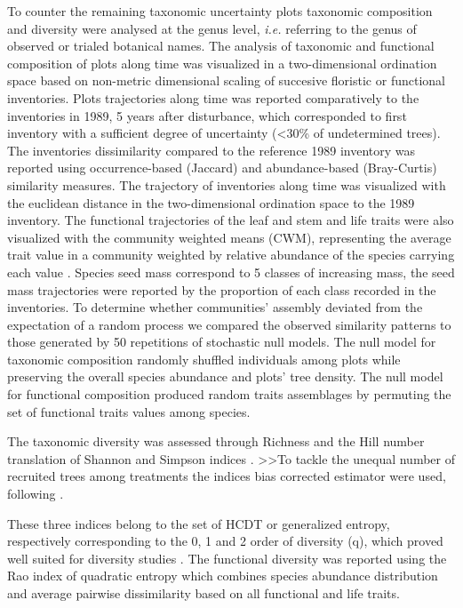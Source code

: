 \documentclass[fleqn,10pt]{ArtEcoFoG} %
\theoremstyle{definition}
\theoremstyle{definition}
\theoremstyle{definition}
\theoremstyle{remark}
\begin{document}
To counter the remaining taxonomic uncertainty plots taxonomic
composition and diversity were analysed at the genus level, \emph{i.e.}
referring to the genus of observed or trialed botanical names. The
analysis of taxonomic and functional composition of plots along time was
visualized in a two-dimensional ordination space based on non-metric
dimensional scaling of succesive floristic or functional inventories.
Plots trajectories along time was reported comparatively to the
inventories in 1989, 5 years after disturbance, which corresponded to
first inventory with a sufficient degree of uncertainty (\textless{}30\%
of undetermined trees). The inventories dissimilarity compared to the
reference 1989 inventory was reported using occurrence-based (Jaccard)
and abundance-based (Bray-Curtis) similarity measures. The trajectory of
inventories along time was visualized with the euclidean distance in the
two-dimensional ordination space to the 1989 inventory. The functional
trajectories of the leaf and stem and life traits were also visualized
with the community weighted means (CWM), representing the average trait
value in a community weighted by relative abundance of the species
carrying each value \citep{Diaz2007, Garnier2004}. Species seed mass
correspond to 5 classes of increasing mass, the seed mass trajectories
were reported by the proportion of each class recorded in the
inventories. To determine whether communities' assembly deviated from
the expectation of a random process we compared the observed similarity
patterns to those generated by 50 repetitions of stochastic null models.
The null model for taxonomic composition randomly shuffled individuals
among plots while preserving the overall species abundance and plots'
tree density. The null model for functional composition produced random
traits assemblages by permuting the set of functional traits values
among species.

The taxonomic diversity was assessed through Richness and the Hill
number translation of Shannon and Simpson indices \citep{Hill1973}.
\textgreater{}\textgreater{}To tackle the unequal number of recruited
trees among treatments the indices bias corrected estimator were used,
following \citep{Chao2015, Marcon2015b}.

These three indices belong to the set of HCDT or generalized entropy,
respectively corresponding to the 0, 1 and 2 order of diversity (q),
which proved well suited for diversity studies
\citep{Patil1982, Tothmeresz1995}. The functional diversity was reported
using the Rao index of quadratic entropy which combines species
abundance distribution and average pairwise dissimilarity based on all
functional and life traits.
\end{document}
